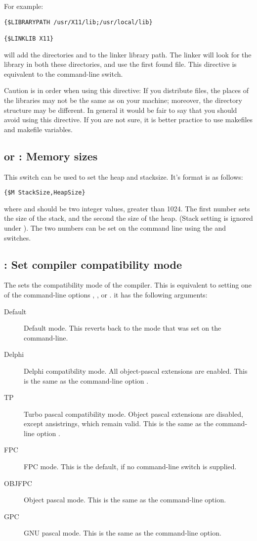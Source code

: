 For example:
\begin{verbatim}
{$LIBRARYPATH /usr/X11/lib;/usr/local/lib}

{$LINKLIB X11}
\end{verbatim}

will add the directories  and  to
the linker library path. The linker will look for the library 
in both these directories, and use the first found file. This directive is
equivalent to the  command-line switch.

Caution is in order when using this directive: If you distribute files, the
places of the libraries may not be the same as on your machine; moreover, the
directory structure may be different. In general it would be fair to say
that you should avoid using this directive. If you are not sure, it is better
practice to use makefiles and makefile variables.

\subsection{ or  : Memory sizes}

This switch can be used to set the heap and stacksize. It's format is as
follows:
\begin{verbatim}
{$M StackSize,HeapSize}
\end{verbatim}
where  and  should be two integer values,
greater than 1024. The first number sets the size of the stack, and the
second the size of the heap. (Stack setting is ignored under \linux).
The two numbers can be set on the command line using the 
and  switches.

\subsection{ : Set compiler compatibility mode}

The  sets the compatibility mode of the compiler. This
is equivalent to setting one of the command-line options ,
,  or . it has the following arguments:
\begin{description}
\item[Default] Default mode. This reverts back to the mode that was set on
the command-line.
\item[Delphi] Delphi compatibility mode. All object-pascal extensions are
enabled. This is the same as the command-line option .
\item[TP] Turbo pascal compatibility mode. Object pascal extensions are
disabled, except ansistrings, which remain valid.
This is the same as the command-line option .
\item[FPC] FPC mode. This is the default, if no command-line switch is
supplied.
\item[OBJFPC] Object pascal mode. This is the same as the 
command-line option.
\item[GPC] GNU pascal mode. This is the same as the  command-line
option.
\end{description}

